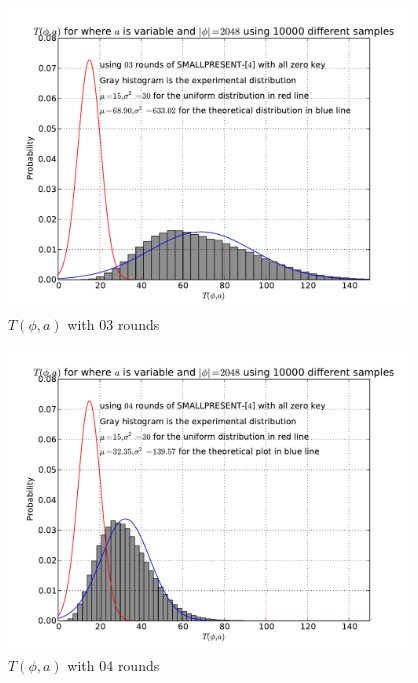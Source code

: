 \begin{figure}[h!]
    \centering
    \includegraphics[width= \textwidth , height = 8cm]{images/T_a_phi_variable_a_variable_phi_03_round_plot}
    \caption{$T(\phi,a)$ with $03$ rounds}
    \label{fig:T_a_phi_variable_a_variable_phi_03_round}
\end{figure}
\begin{figure}[h!]
    \centering
    \includegraphics[width=\textwidth , height = 8cm]{images/T_a_phi_variable_a_variable_phi_04_round_plot}
    \caption{$T(\phi,a)$ with $04$ rounds}
    \label{fig:T_a_phi_variable_a_variable_phi_04_round}
\end{figure}

